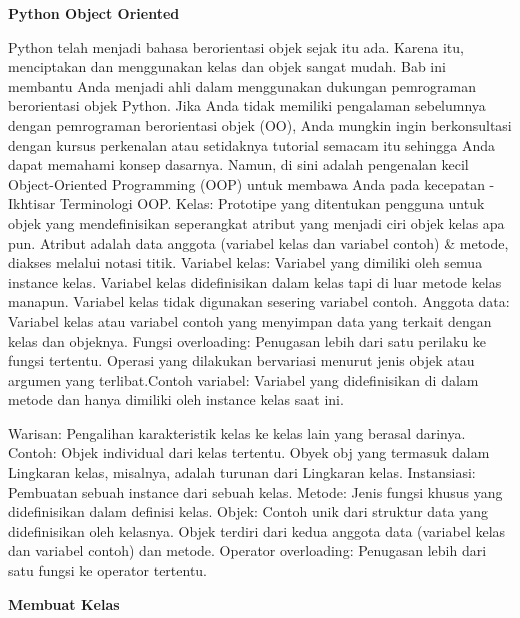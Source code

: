 \sloppy
\begin{center}{\fontsize{16pt}{16pt}\selectfont \textbf{Python Object Oriented} \\}\end{center} \par
Python telah menjadi bahasa berorientasi objek sejak itu ada. Karena itu, menciptakan dan menggunakan kelas dan objek sangat mudah. Bab ini membantu Anda menjadi ahli dalam menggunakan dukungan pemrograman berorientasi objek Python. Jika Anda tidak memiliki pengalaman sebelumnya dengan pemrograman berorientasi objek (OO), Anda mungkin ingin berkonsultasi dengan kursus perkenalan atau setidaknya tutorial semacam itu sehingga Anda dapat memahami konsep dasarnya. Namun, di sini adalah pengenalan kecil Object-Oriented Programming (OOP) untuk membawa Anda pada kecepatan - Ikhtisar Terminologi OOP. Kelas: Prototipe yang ditentukan pengguna untuk objek yang mendefinisikan seperangkat atribut yang menjadi ciri objek kelas apa pun. Atribut adalah data anggota (variabel kelas dan variabel contoh) \& metode, diakses melalui notasi titik. Variabel kelas: Variabel yang dimiliki oleh semua instance kelas. Variabel kelas didefinisikan dalam kelas tapi di luar metode kelas manapun. Variabel kelas tidak digunakan sesering variabel contoh. Anggota data: Variabel kelas atau variabel contoh yang menyimpan data yang terkait dengan kelas dan objeknya. Fungsi overloading: Penugasan lebih dari satu perilaku ke fungsi tertentu. Operasi yang dilakukan bervariasi menurut jenis objek atau argumen yang terlibat.Contoh variabel: Variabel yang didefinisikan di dalam metode dan hanya dimiliki oleh instance kelas saat ini. \par
Warisan: Pengalihan karakteristik kelas ke kelas lain yang berasal darinya. Contoh: Objek individual dari kelas tertentu. Obyek obj yang termasuk dalam Lingkaran kelas, misalnya, adalah turunan dari Lingkaran kelas. Instansiasi: Pembuatan sebuah instance dari sebuah kelas. Metode: Jenis fungsi khusus yang didefinisikan dalam definisi kelas.  Objek: Contoh unik dari struktur data yang didefinisikan oleh kelasnya. Objek terdiri dari kedua anggota data (variabel kelas dan variabel contoh) dan metode. Operator overloading: Penugasan lebih dari satu fungsi ke operator tertentu. \par
\vspace{12pt}
\noindent 
{\fontsize{14pt}{14pt}\selectfont \textbf{Membuat Kelas} \\} \par
\vspace{12pt}
